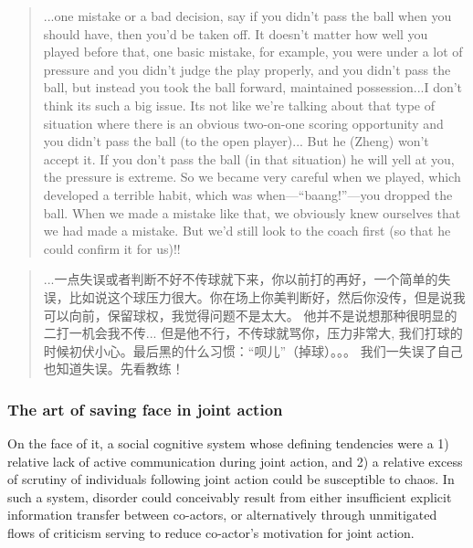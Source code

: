 \begin{CJK}{UTF8}{gbsn}
    \begin{quotation}
      ...one mistake or a bad decision, say if you didn't pass the ball when you should have, then you'd be taken off.  It doesn't matter how well you played before that, one basic mistake, for example, you were under a lot of pressure and you didn't judge the play properly, and you didn't pass the ball, but instead you took the ball forward, maintained possession...I don't think its such a big issue.
      Its not like we're talking about that type of situation where there is an obvious two-on-one scoring opportunity and you didn't pass the ball (to the open player)...
      But he (Zheng) won't accept it.  If you don't pass the ball (in that situation) he will yell at you, the pressure is extreme.  So we became very careful when we played, which developed a terrible habit, which was when---``baang!''---you dropped the ball. When we made a mistake like that, we obviously knew ourselves that we had made a mistake.  But we'd still look to the coach first (so that he could confirm it for us)!!
    \end{quotation}

    \begin{quotation}
      ...一点失误或者判断不好不传球就下来，你以前打的再好，一个简单的失误，比如说这个球压力很大。你在场上你美判断好，然后你没传，但是说我可以向前，保留球权，我觉得问题不是太大。
      他并不是说想那种很明显的二打一机会我不传...
      但是他不行，不传球就骂你，压力非常大, 我们打球的时候初伏小心。最后黑的什么习惯：“呗儿”（掉球）。。。 我们一失误了自己也知道失误。先看教练！
    \end{quotation}




\subsubsection{The art of saving face in joint action\label{sect:savingFaceJointAction}}
On the face of it, a social cognitive system whose defining tendencies were a 1) relative lack of active communication during joint action, and 2) a relative excess of scrutiny of individuals following joint action could be susceptible to chaos. In such a system, disorder could conceivably result from either insufficient explicit information transfer between co-actors, or alternatively through unmitigated flows of criticism serving to reduce co-actor's motivation for joint action.


\end{CJK}
